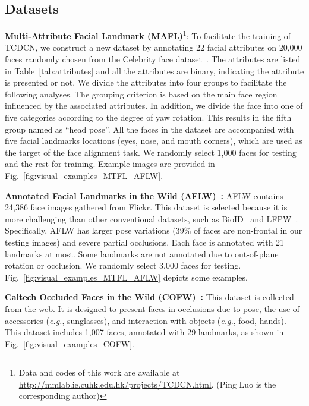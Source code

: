 \documentclass[10pt,journal,compsoc]{IEEEtran}
\newcommand{\eg}{\emph{e.g.}}
\begin{document}
\subsection{Datasets}
\label{sec:datasets}
\vspace{0.1cm}
\noindent\textbf{Multi-Attribute Facial Landmark (MAFL)}\footnote{Data and codes of this work are available at \url{http://mmlab.ie.cuhk.edu.hk/projects/TCDCN.html}. (Ping Luo is the corresponding author)}: To facilitate the training of TCDCN, we construct a new dataset by annotating 22 facial attributes on 20,000 faces randomly chosen from the Celebrity face dataset~\cite{sun2014deep}. The attributes are listed in Table~\ref{tab:attributes} and all the attributes are binary, indicating the attribute is presented or not. We divide the attributes into four groups to facilitate the following analyses. The grouping criterion is based on the main face region influenced by the associated attributes. In addition, we divide the face into one of five categories according to the degree of yaw rotation. This results in the fifth group named as ``head pose''.
All the faces in the dataset are accompanied with five facial landmarks locations (eyes, nose, and mouth corners), which are used as the target of the face alignment task. We randomly select 1,000 faces for testing and the rest for training. Example images are provided in Fig.~\ref{fig:visual_examples_MTFL_AFLW}.

\vspace{0.1cm}
\noindent\textbf{Annotated Facial Landmarks in the Wild (AFLW)~\cite{Kostinger2011}:} AFLW contains 24,386 face images gathered from Flickr. This dataset is selected because it is more challenging than other conventional datasets, such as BioID~\cite{Jesorsky} and LFPW~\cite{Belhumeur2011}. Specifically, AFLW has larger pose variations (39\% of faces are non-frontal in our testing images) and severe partial occlusions. Each face is annotated with 21 landmarks at most. Some landmarks are not annotated due to out-of-plane rotation or occlusion. We randomly select 3,000 faces for testing. Fig.~\ref{fig:visual_examples_MTFL_AFLW} depicts some examples.

\vspace{0.1cm}
\noindent\textbf{Caltech Occluded Faces in the Wild (COFW)~\cite{dollar13}:} This dataset is collected from the web. It is designed to present faces in occlusions due to pose, the use of accessories (\eg, sunglasses), and interaction with objects (\eg, food, hands). This dataset includes 1,007 faces, annotated with 29 landmarks, as shown in Fig.~\ref{fig:visual_examples_COFW}.
\end{document}
